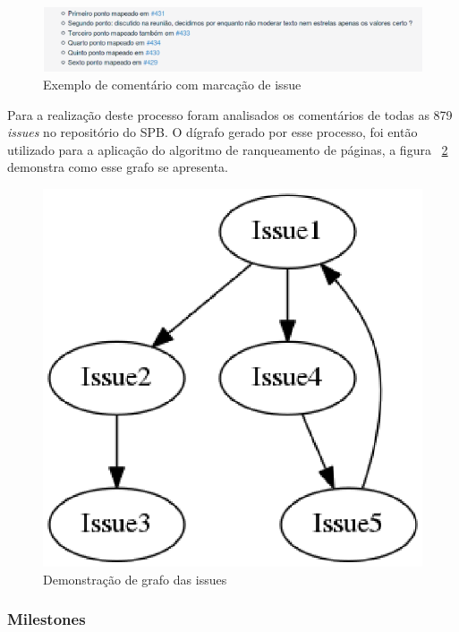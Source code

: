 \begin{figure}[h]
    \centering
        \includegraphics[keepaspectratio=true,scale=0.5]{figuras/issue-comment.eps}
    \caption{Exemplo de comentário com marcação de issue}
    \label{fig:issue-comment}
\end{figure}

Para a realização deste processo foram analisados os comentários de todas as 879
\textit{issues} no repositório do SPB. O dígrafo gerado por esse processo, foi
então utilizado para a aplicação do algoritmo de ranqueamento de páginas, a figura
~\ref{fig:issue-graph} demonstra como esse grafo se apresenta.

\begin{figure}[h]
    \centering
        \includegraphics[keepaspectratio=true,scale=0.5]{figuras/issue-graph.eps}
    \caption{Demonstração de grafo das issues}
    \label{fig:issue-graph}
\end{figure}


\subsubsection{Milestones}
\label{est:ran:mil}

